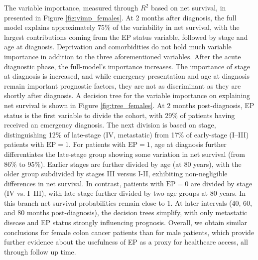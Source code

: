 \documentclass[12pt]{article}
\begin{document}
The variable importance, measured through $R^2$ based on net survival,  in presented in Figure \ref{fig:vimp_females}. At 2 months after diagnosis, the full model explains approximately $75\%$ of the variability in net survival, with the largest contributions coming from the EP status variable, followed by stage and age at diagnosis. Deprivation and comorbidities do not hold much variable importance in addition to the three aforementioned variables. After the acute diagnostic phase, the full-model's importance increases. The importance of stage at diagnosis is increased, and while emergency presentation and age at diagnosis remain important prognostic factors, they are not as discriminant as they are shortly after diagnosis.
A decision tree for the variable importance on explaining net survival is shown in Figure \ref{fig:tree_females}. At 2 months post-diagnosis, EP status is the first variable to divide the cohort, with 29\% of patients having received an emergency diagnosis. The next division is based on stage, distinguishing 12\% of late-stage (IV, metastatic) from 17\% of early-stage (I–III) patients with $\text{EP}=1$. For patients with $\text{EP} = 1$, age at diagnosis further differentiates the late-stage group showing some variation in net survival (from 86\% to 95\%). Earlier stages are further divided by age (at 80 years), with the older group subdivided by stages III versus I-II, exhibiting non-negligible differences in net survival.
In contrast, patients with $\text{EP} = 0$ are divided by stage (IV vs. I--III), with late stage further divided by two age groups at 80 years. In this branch net survival probabilities remain close to 1. At later intervals (40, 60, and 80 months post-diagnosis), the decision trees simplify, with only metastatic disease and EP status strongly influencing prognosis. Overall, we obtain similar conclusions for female colon cancer patients than for male patients, which provide further evidence about the usefulness of EP as a proxy for healthcare access, all through follow up time.
\end{document}
